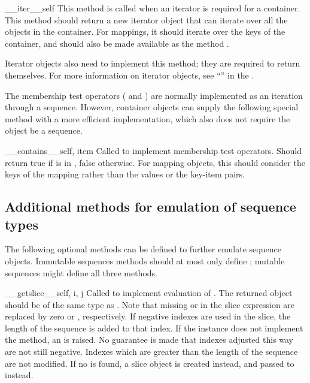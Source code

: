 \begin{methoddesc}{__iter__}{self}
This method is called when an iterator is required for a container.
This method should return a new iterator object that can iterate over
all the objects in the container.  For mappings, it should iterate
over the keys of the container, and should also be made available as
the method .

Iterator objects also need to implement this method; they are required
to return themselves.  For more information on iterator objects, see
``'' in the
.
\end{methoddesc}

The membership test operators ( and ) are
normally implemented as an iteration through a sequence.  However,
container objects can supply the following special method with a more
efficient implementation, which also does not require the object be a
sequence.

\begin{methoddesc}{__contains__}{self, item}
Called to implement membership test operators.  Should return true if
 is in , false otherwise.  For mapping objects,
this should consider the keys of the mapping rather than the values or
the key-item pairs.
\end{methoddesc}


\subsection{Additional methods for emulation of sequence types
  \label{sequence-methods}}

The following optional methods can be defined to further emulate sequence
objects.  Immutable sequences methods should at most only define
; mutable sequences might define all three
methods.

\begin{methoddesc}{__getslice__}{self, i, j}
Called to implement evaluation of .
The returned object should be of the same type as .  Note
that missing  or  in the slice expression are replaced
by zero or , respectively.  If negative indexes are
used in the slice, the length of the sequence is added to that index.
If the instance does not implement the  method, an
 is raised.
No guarantee is made that indexes adjusted this way are not still
negative.  Indexes which are greater than the length of the sequence
are not modified.
If no  is found, a slice
object is created instead, and passed to  instead.
\end{methoddesc}

